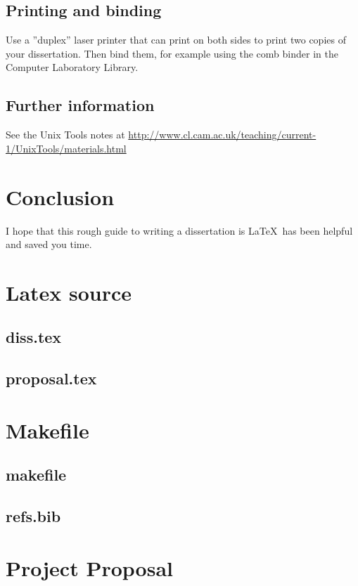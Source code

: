 \documentclass[12pt,a4paper,twoside,openright]{report}
\begin{document}
\section{Printing and binding}
Use a ''duplex'' laser printer that can print on both sides to print
two copies of your dissertation. Then bind them, for example using the
comb binder in the Computer Laboratory Library.
\section{Further information}
See the Unix Tools notes at
\url{http://www.cl.cam.ac.uk/teaching/current-1/UnixTools/materials.html}
\chapter{Conclusion}
I hope that this rough guide to writing a dissertation is \LaTeX\ has
been helpful and saved you time.

\appendix
\chapter{Latex source}
\section{diss.tex}
{\scriptsize}
\section{proposal.tex}
{\scriptsize}
\chapter{Makefile}
\section{makefile}\label{makefile}
{\scriptsize}
\section{refs.bib}
{\scriptsize}
\chapter{Project Proposal}

\end{document}
